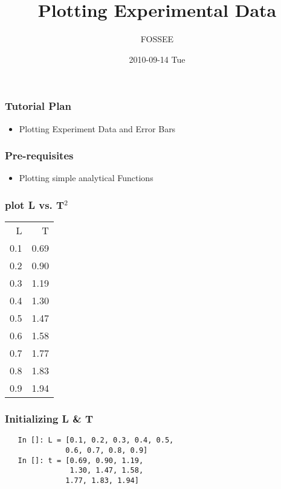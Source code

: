\documentclass[presentation]{beamer}
\title{Plotting Experimental Data}
\author{FOSSEE}
\date{2010-09-14 Tue}
\begin{document}
\maketitle






\begin{frame}
\frametitle{Tutorial Plan}
\label{sec-1}
\begin{itemize}

\item Plotting Experiment Data and Error Bars\\
\label{sec-1.1}%
\end{itemize} %
\end{frame}
\begin{frame}
\frametitle{Pre-requisites}
\label{sec-2}
\begin{itemize}

\item Plotting simple analytical Functions\\
\label{sec-2.1}%
\end{itemize} %
\end{frame}
\begin{frame}
\frametitle{plot L vs. T$^2$}
\label{sec-3}




\begin{center}
\begin{tabular}{rr}
   L  &     T  \\
 0.1  &  0.69  \\
 0.2  &  0.90  \\
 0.3  &  1.19  \\
 0.4  &  1.30  \\
 0.5  &  1.47  \\
 0.6  &  1.58  \\
 0.7  &  1.77  \\
 0.8  &  1.83  \\
 0.9  &  1.94  \\
\end{tabular}
\end{center}


  
  
\end{frame}
\begin{frame}[fragile]
\frametitle{Initializing L \& T}
\label{sec-4}

\begin{verbatim}
   In []: L = [0.1, 0.2, 0.3, 0.4, 0.5,
              0.6, 0.7, 0.8, 0.9]
   In []: t = [0.69, 0.90, 1.19,
               1.30, 1.47, 1.58,
              1.77, 1.83, 1.94]
\end{verbatim}
\end{frame}
\end{document}
